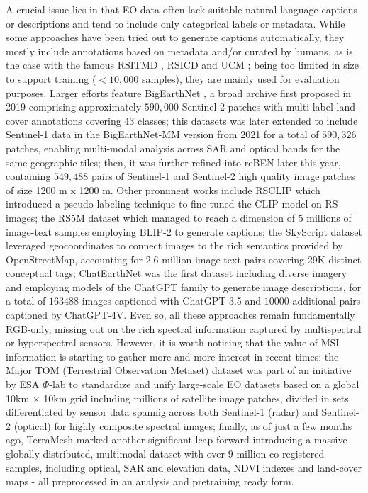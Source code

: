 \documentclass[a4paper, twoside, english]{sapthesis} %
\begin{document}
A crucial issue lies in that EO data often lack suitable natural language captions or descriptions and tend to include only categorical labels or metadata. While some approaches have been tried out to generate captions automatically, they mostly include annotations based on metadata and/or curated by humans, as is the case with the famous RSITMD \cite{yuan2022exploring}, RSICD \cite{lu2017exploring} and UCM \cite{yang2010bag}; being too limited in size to support training ($< 10,000$ samples), they are mainly used for evaluation purposes. Larger efforts feature BigEarthNet \cite{sumbul2019bigearthnet}, a broad archive first proposed in 2019 comprising approximately $590,000$ Sentinel‑2 patches with multi-label land-cover annotations covering 43 classes; this datasets was later extended to include Sentinel‑1 data in the BigEarthNet‑MM version from 2021 \cite{sumbul2021bigearthnet} for a total of $590,326$ patches, enabling multi-modal analysis across SAR and optical bands for the same geographic tiles; then, it was further refined into reBEN \cite{clasen2024reben} later this year, containing $549,488$ pairs of Sentinel-1 and Sentinel-2 high quality image patches of size 1200 m x 1200 m. Other prominent works include RSCLIP \cite{li2023rs} which introduced a pseudo-labeling technique to fine-tuned the CLIP model on RS images; the RS5M dataset \cite{zhang2024rs5m} which managed to reach a dimension of $5$ millions of image-text samples employing BLIP-2 \cite{li2023blip} to generate captions; the SkyScript dataset \cite{wang2024skyscript} leveraged geocoordinates to connect images to the rich semantics provided by OpenStreetMap, accounting for $2.6$ million image-text pairs covering 29K distinct conceptual tags; ChatEarthNet \cite{yuan2024chatearthnet} was the first dataset including diverse imagery and employing models of the ChatGPT family to generate image descriptions, for a total of $163488$ images captioned with ChatGPT-3.5 and $10000$ additional pairs captioned by ChatGPT-4V. Even so, all these approaches remain fundamentally RGB-only, missing out on the rich spectral information captured by multispectral or hyperspectral sensors. However, it is worth noticing that the value of MSI information is starting to gather more and more interest in recent times: the Major TOM (Terrestrial Observation Metaset) dataset \cite{francis2024major} was part of an initiative by ESA $\Phi$-lab to standardize and unify large-scale EO datasets based on a global 10km $\times$ 10km grid including millions of satellite image patches, divided in sets differentiated by sensor data spannig across both Sentinel-1 (radar) and Sentinel-2 (optical) for highly composite spectral images; finally, as of just a few months ago, TerraMesh \cite{blumenstiel2025terramesh} marked another significant leap forward introducing a massive globally distributed, multimodal dataset with over $9$ million co-registered samples, including optical, SAR and elevation data, NDVI indexes and land-cover maps - all preprocessed in an analysis and pretraining ready form.
\end{document}
